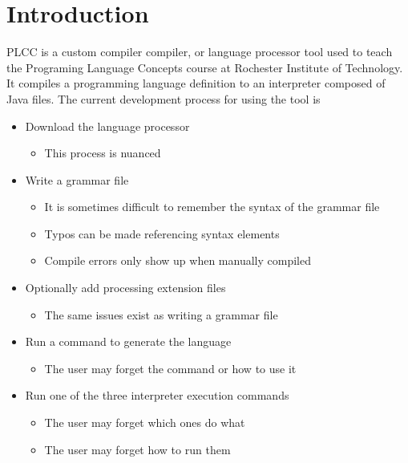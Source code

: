 \documentclass[conference, letterpaper]{IEEEtran}
\begin{document}
\section{Introduction}\label{sec:introduction}
PLCC\cite{plcc-paper} is a custom compiler compiler, or language processor tool used to teach the Programing Language Concepts course at Rochester Institute of Technology.
It compiles a programming language definition to an interpreter composed of Java files.
The current development process for using the tool is
\begin{itemize}
    \item Download the language processor
    \begin{itemize}
        \item This process is nuanced
    \end{itemize}

    \item Write a grammar file
    \begin{itemize}
        \item It is sometimes difficult to remember the syntax of the grammar file
        \item Typos can be made referencing syntax elements
        \item Compile errors only show up when manually compiled
    \end{itemize}

    \item Optionally add processing extension files
    \begin{itemize}
        \item The same issues exist as writing a grammar file
    \end{itemize}

    \item Run a command to generate the language
    \begin{itemize}
        \item The user may forget the command or how to use it
    \end{itemize}

    \item Run one of the three interpreter execution commands
    \begin{itemize}
        \item The user may forget which ones do what
        \item The user may forget how to run them
    \end{itemize}
\end{itemize}
\end{document}
